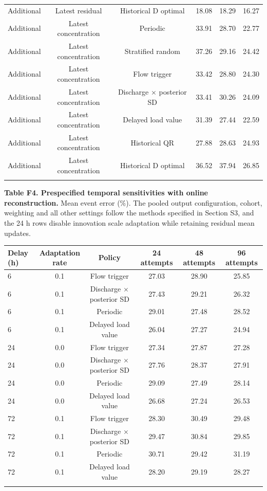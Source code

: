\documentclass[lineno,pdflatex,sn-apa]{sn-jnl}%
\theoremstyle{thmstyleone}%
\theoremstyle{thmstyletwo}%
\theoremstyle{thmstylethree}%
\begin{document}
\begin{center}
\begin{tabular}{@{}lccccc@{}}
Additional & Latest residual & Historical D optimal & 18.08 & 18.29 & 16.27\\
Additional & Latest concentration & Periodic & 33.91 & 28.70 & 22.77\\
Additional & Latest concentration & Stratified random & 37.26 & 29.16 & 24.42\\
Additional & Latest concentration & Flow trigger & 33.42 & 28.80 & 24.30\\
Additional & Latest concentration & Discharge $\times$ posterior SD & 33.41 & 30.26 & 24.09\\
Additional & Latest concentration & Delayed load value & 31.39 & 27.44 & 22.59\\
Additional & Latest concentration & Historical QR & 27.88 & 28.63 & 24.93\\
Additional & Latest concentration & Historical D optimal & 36.52 & 37.94 & 26.85\\
\botrule
\end{tabular}
\end{center}

\textbf{Table F4. Prespecified temporal sensitivities with online reconstruction.} Mean event error (\%). The pooled output configuration, cohort, weighting and all other settings follow the methods specified in Section S3, and the 24 h rows disable innovation scale adaptation while retaining residual mean updates.

\begin{center}
\footnotesize
\setlength{\tabcolsep}{2pt}
\begin{tabular}{@{}lccccc@{}}
\toprule
Delay (h) & \shortstack{Adaptation\\rate} & Policy & 24 attempts & 48 attempts & 96 attempts\\
\midrule
6 & 0.1 & Flow trigger & 27.03 & 28.90 & 25.85\\
6 & 0.1 & Discharge $\times$ posterior SD & 27.43 & 29.21 & 26.32\\
6 & 0.1 & Periodic & 29.01 & 27.48 & 28.52\\
6 & 0.1 & Delayed load value & 26.04 & 27.27 & 24.94\\
24 & 0.0 & Flow trigger & 27.34 & 27.87 & 27.28\\
24 & 0.0 & Discharge $\times$ posterior SD & 27.76 & 28.37 & 27.91\\
24 & 0.0 & Periodic & 29.09 & 27.49 & 28.14\\
24 & 0.0 & Delayed load value & 26.68 & 27.24 & 26.53\\
72 & 0.1 & Flow trigger & 28.30 & 30.49 & 29.48\\
72 & 0.1 & Discharge $\times$ posterior SD & 29.47 & 30.84 & 29.85\\
72 & 0.1 & Periodic & 30.71 & 29.42 & 31.19\\
72 & 0.1 & Delayed load value & 28.20 & 29.19 & 28.27\\
\botrule
\end{tabular}
\end{center}
\end{document}
